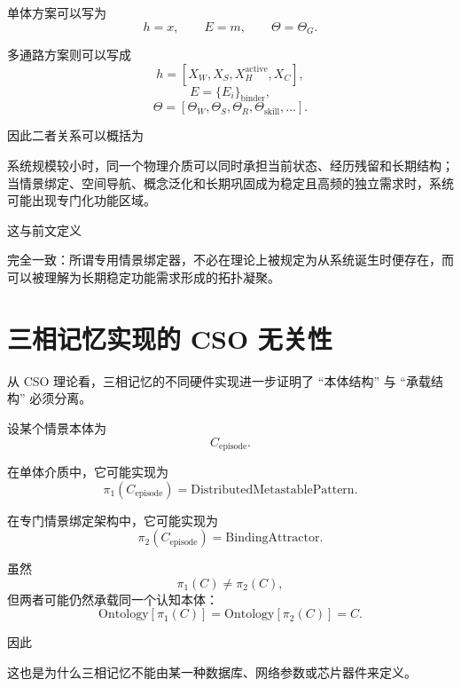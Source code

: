 单体方案可以写为
\[
h=x,
\qquad
E=m,
\qquad
\Theta=\Theta_G.
\]

多通路方案则可以写成
\[
h=
[
X_W,
X_S,
X_H^{\mathrm{active}},
X_C
],
\]
\[
E=
\{E_i\}_{\mathrm{binder}},
\]
\[
\Theta=
[
\Theta_W,
\Theta_S,
\Theta_R,
\Theta_{\mathrm{skill}},
\ldots
].
\]

因此二者关系可以概括为
\begin{statementbox}
\centering
{}
\end{statementbox}

系统规模较小时，同一个物理介质可以同时承担当前状态、经历残留和长期结构；当情景绑定、空间导航、概念泛化和长期巩固成为稳定且高频的独立需求时，系统可能出现专门化功能区域。

这与前文定义
\begin{statementbox}
\centering
{}
\end{statementbox}
完全一致：所谓专用情景绑定器，不必在理论上被规定为从系统诞生时便存在，而可以被理解为长期稳定功能需求形成的拓扑凝聚。

\section{三相记忆实现的 CSO 无关性}

从 CSO 理论看，三相记忆的不同硬件实现进一步证明了 ``本体结构'' 与 ``承载结构'' 必须分离。

设某个情景本体为
\[
C_{\mathrm{episode}}.
\]

在单体介质中，它可能实现为
\[
\pi_1(C_{\mathrm{episode}})
=
\mathrm{DistributedMetastablePattern}.
\]

在专门情景绑定架构中，它可能实现为
\[
\pi_2(C_{\mathrm{episode}})
=
\mathrm{BindingAttractor}.
\]

虽然
\[
\pi_1(C)\neq\pi_2(C),
\]
但两者可能仍然承载同一个认知本体：
\[
\boxed{
\mathrm{Ontology}[\pi_1(C)]
=
\mathrm{Ontology}[\pi_2(C)]
=
C.
}
\]

因此
\begin{statementbox}
\centering
{}
\end{statementbox}

这也是为什么三相记忆不能由某一种数据库、网络参数或芯片器件来定义。

